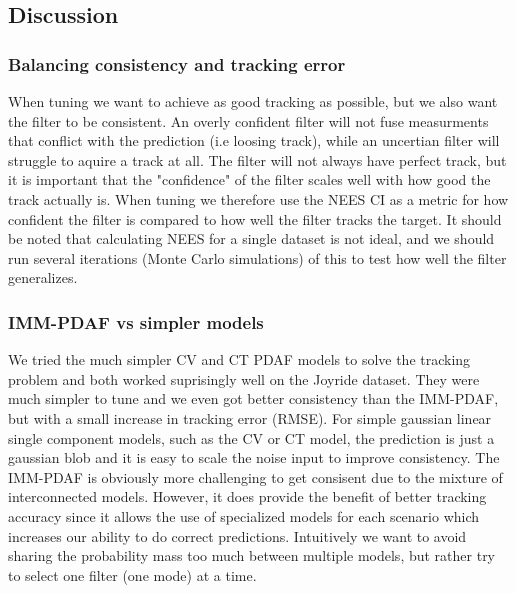 \subsection{Discussion}
\subsubsection{Balancing consistency and tracking error}
When tuning we want to achieve as good tracking as possible, but we also want the filter to be consistent. An overly confident filter will not fuse measurments that conflict with the prediction (i.e loosing track), while an uncertian filter will struggle to aquire a track at all. The filter will not always have perfect track, but it is important that the "confidence" of the filter scales well with how good the track actually is.
When tuning we therefore use the NEES CI as a metric for how confident the filter is compared to how well the filter tracks the target. It should be noted that calculating NEES for a single dataset is not ideal, and we should run several iterations (Monte Carlo simulations) of this to test how well the filter generalizes.

\subsubsection{IMM-PDAF vs simpler models} \label{whyimmpdaf}
We tried the much simpler CV and CT PDAF models to solve the tracking problem and both worked suprisingly well on the Joyride dataset. They were much simpler to tune and we even got better consistency than the IMM-PDAF, but with a small increase in tracking error (RMSE). For simple gaussian linear single component models, such as the CV or CT model, the prediction is just a gaussian blob and it is easy to scale the noise input to improve consistency. The IMM-PDAF is obviously more challenging to get consisent due to the mixture of interconnected models. However, it does provide the benefit of better tracking accuracy since it allows the use of specialized models for each scenario which increases our ability to do correct predictions. Intuitively we want to avoid sharing the probability mass too much between multiple models, but rather try to select one filter (one mode) at a time.
